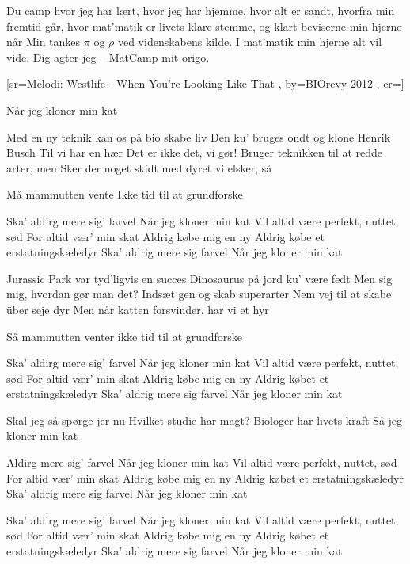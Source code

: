 \documentclass[pdftex,12pt]{article}
\begin{document}
\begin{songs}{}
\beginverse
Du camp hvor jeg har lært, hvor jeg har hjemme,
hvor alt er sandt, hvorfra min fremtid går,
hvor mat'matik er livets klare stemme,
og klart beviserne min hjerne når
Min tankes $\pi$ og $\rho$
ved videnskabens kilde.
I mat'matik min hjerne alt vil vide.
Dig agter jeg -- MatCamp mit origo.
\endverse
\endsong



[sr={Melodi: Westlife - When You're Looking Like That}
,
by={BIOrevy 2012}
,
cr={}]\hypertarget{Når Jeg Kloner Min Kat}{}
\label{song4}

\beginverse
Når jeg kloner min kat

\endverse
\beginverse
Med en ny teknik kan os på bio skabe liv
Den ku' bruges ondt og klone Henrik Busch
Til vi har en hær
Det er ikke det, vi gør!
Bruger teknikken til at redde arter, men
Sker der noget skidt med dyret vi elsker, så

\endverse
\beginverse
Må mammutten vente
Ikke tid til at grundforske

\endverse
\beginverse
Ska' aldirg mere sig' farvel
Når jeg kloner min kat
Vil altid være perfekt, nuttet, sød
For altid vær' min skat
Aldrig købe mig en ny
Aldrig købe et erstatningskæledyr
Ska' aldrig mere sig farvel
Når jeg kloner min kat

\endverse
\beginverse
Jurassic Park var tyd'ligvis en succes
Dinosaurus på jord ku' være fedt
Men sig mig, hvordan gør man det?
Indsæt gen og skab superarter
Nem vej til at skabe über seje dyr
Men når katten forsvinder, har vi et hyr

\endverse
\beginverse
Så mammutten venter
ikke tid til at grundforske

\endverse
\beginverse
Ska' aldirg mere sig' farvel
Når jeg kloner min kat
Vil altid være perfekt, nuttet, sød
For altid vær' min skat
Aldrig købe mig en ny
Aldrig købet et erstatningskæledyr
Ska' aldrig mere sig farvel
Når jeg kloner min kat

\endverse
\beginverse
Skal jeg så spørge jer nu
Hvilket studie har magt?
Biologer har livets kraft
Så jeg kloner min kat

\endverse
\beginverse
Aldirg mere sig' farvel
Når jeg kloner min kat
Vil altid være perfekt, nuttet, sød
For altid vær' min skat
Aldrig købe mig en ny
Aldrig købet et erstatningskæledyr
Ska' aldrig mere sig farvel
Når jeg kloner min kat

\endverse
\beginverse
Ska' aldirg mere sig' farvel
Når jeg kloner min kat
Vil altid være perfekt, nuttet, sød
For altid vær' min skat
Aldrig købe mig en ny
Aldrig købet et erstatningskæledyr
Ska' aldrig mere sig farvel
Når jeg kloner min kat


\end{songs}
\end{document}
